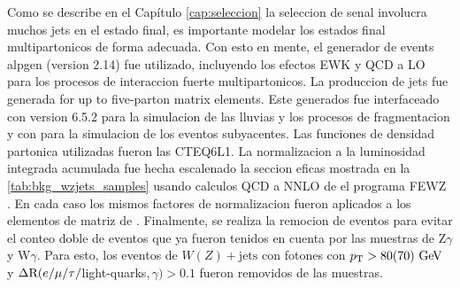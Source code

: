 Como se describe en el Capítulo \ref{cap:seleccion} la seleccion de senal involucra
muchos jets en el estado final, es importante modelar los estados final multipartonicos
de forma adecuada. Con esto en mente, el generador de events {alpgen} (version 2.14)
fue utilizado, incluyendo los efectos EWK y QCD a LO para los procesos de interaccion
fuerte multipartonicos. La produccion de jets fue generada for up to five-parton
matrix elements. Este generados fue interfaceado con {\herwig} version 6.5.2
para la simulacion de las lluvias y los procesos de fragmentacion y con {\jimmy}
para la simulacion de los eventos subyacentes. Las funciones de densidad partonica
utilizadas fueron las CTEQ6L1. La normalizacion a la luminosidad integrada acumulada
fue hecha escalenado la seccion eficas mostrada en la {\tab} \ref{tab:bkg_wzjets_samples}
usando calculos QCD a NNLO de el programa FEWZ \cite{Anastasiou:2003ds}.
En cada caso los mismos factores de normalizacion fueron aplicados a los elementos
de matriz de {\alpgen}.
Finalmente, se realiza la remocion de eventos para evitar el conteo doble de eventos
que ya fueron tenidos en cuenta por las muestras de Z$\gamma$ y W$\gamma$.
Para esto, los eventos de $W(Z)+\text{jets}$ con fotones con $\pt > 80(70)\gev$
y $\Delta{\rm R}(e/\mu/\tau/$light-quarks$, \gamma) > 0.1$ fueron removidos
de las muestras.

